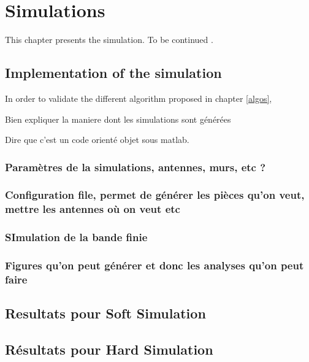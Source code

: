 \chapter{Simulations}
\label{simulations}

This chapter presents the simulation. \color{red} To be continued \color{black}.

\section{Implementation of the simulation}

In order to validate the different algorithm proposed in chapter \ref{algos}, 

Bien expliquer la maniere dont les simulations sont générées

Dire que c'est un code orienté objet sous matlab.

\subsection{Paramètres de la simulations, antennes, murs, etc ?}

\subsection{Configuration file, permet de générer les pièces qu'on veut, mettre les antennes où on veut etc}

\subsection{SImulation de la bande finie}

\subsection{Figures qu'on peut générer et donc les analyses qu'on peut faire}

\section{Resultats pour Soft Simulation}

\section{Résultats pour Hard Simulation}
